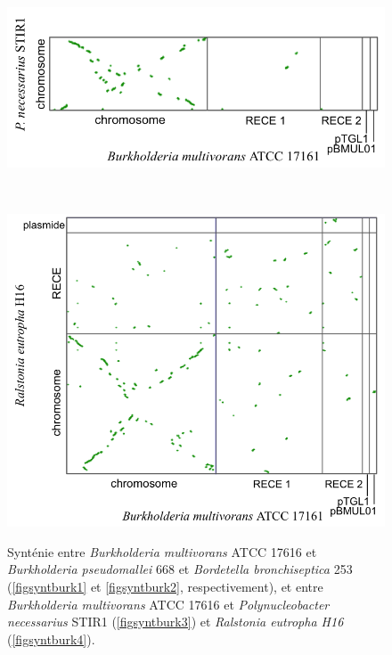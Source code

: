 \begin{figure}[H]
\begin{center}
\begin{minipage}{0.5\textwidth}
	\end{minipage}
\\
\vspace{0.5cm}
	\begin{minipage}{0.5\textwidth}
		\includegraphics[width=1.1\textwidth]{./img/synteny/new/fig8_10c.png}
		\label{figsyntburk3}
	\end{minipage}
\\
\vspace{0.5cm}
	\begin{minipage}{0.5\textwidth}
		\includegraphics[width=1.1\textwidth]{./img/synteny/new/fig8_10d.png}
		\label{figsyntburk4}
	\end{minipage}
\caption[Synténie de \textit{Burkholderia} \textit{vs.} autres Burkholderiales]{Synténie entre \textit{Burkholderia multivorans} ATCC 17616 et \textit{Burkholderia pseudomallei} 668 et \textit{Bordetella bronchiseptica} 253 (\ref{figsyntburk1} et \ref{figsyntburk2}, respectivement), et entre \textit{Burkholderia multivorans} ATCC 17616 et \textit{Polynucleobacter necessarius}  STIR1 (\ref{figsyntburk3}) et \textit{Ralstonia eutropha H16} (\ref{figsyntburk4}).} \label{figsyntburk}
\end{center}  
\end{figure}  

